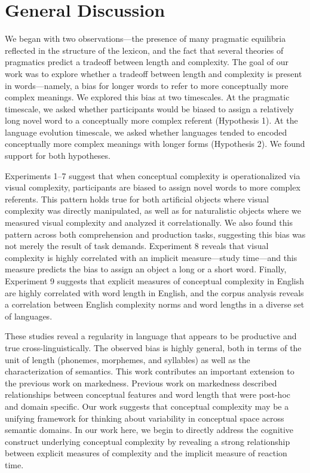 \section{General Discussion}

We began with two observations---the presence of many pragmatic equilibria reflected in the structure of the lexicon, and the fact that several theories of pragmatics predict a tradeoff between length and complexity. The goal of our work was to explore whether a tradeoff between length and complexity is present in words---namely, a bias for longer words to refer to more conceptually more complex meanings. We explored this bias at two timescales. At the pragmatic timescale, we asked whether participants would be biased to assign a relatively long novel word to a conceptually more complex referent (Hypothesis 1). At the language evolution timescale, we asked whether languages tended to encoded conceptually more complex meanings with longer forms (Hypothesis 2). We found support for both hypotheses.

Experiments 1--7 suggest that when conceptual complexity is operationalized via visual complexity, participants are biased to assign novel words to more complex referents. This pattern holds true for both artificial objects where visual complexity was directly manipulated, as well as for naturalistic objects where we measured visual complexity and analyzed it correlationally. We also found this pattern across both comprehension and production tasks, suggesting this bias was not merely the result of task demands. Experiment 8 reveals that visual complexity is highly correlated with an implicit measure---study time---and this measure predicts the bias to assign an object a long or a short word. Finally, Experiment 9 suggests that explicit measures of conceptual complexity in English are highly correlated with word length in English, and the corpus analysis reveals a correlation between English complexity norms and word lengths in a diverse set of languages.

These studies reveal a regularity in language that appears to be productive and true cross-linguistically. The observed bias is highly general, both in terms of the unit of length (phonemes, morphemes, and syllables) as well as the characterization of semantics. This work contributes an important extension to the previous work on markedness. Previous work on markedness described relationships between conceptual features and word length that were post-hoc and domain specific. Our work suggests that conceptual complexity may be a unifying framework for thinking about variability in conceptual space across semantic domains. In our work here, we begin to directly address the cognitive construct underlying conceptual complexity by revealing a strong relationship between explicit measures of complexity and the implicit measure of reaction time.

